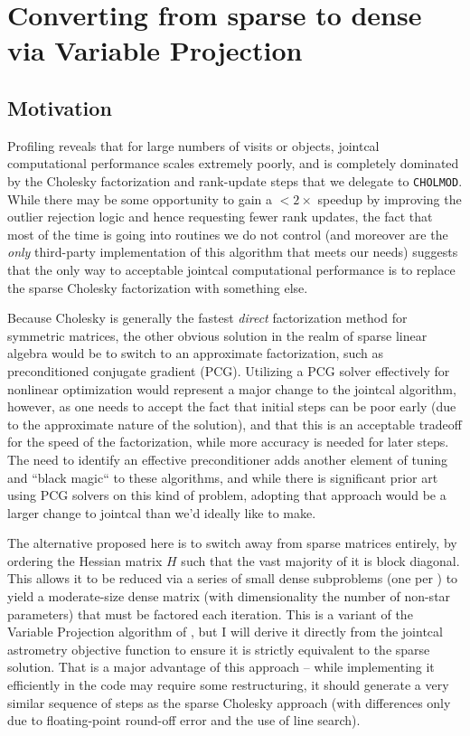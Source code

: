 \section{Converting from sparse to dense via Variable Projection}

\subsection{Motivation}

Profiling reveals that for large numbers of visits or objects, jointcal computational performance scales extremely poorly, and is completely dominated by the Cholesky factorization and rank-update steps that we delegate to \texttt{CHOLMOD}.
While there may be some opportunity to gain a $<2\times$ speedup by improving the outlier rejection logic and hence requesting fewer rank updates, the fact that most of the time is going into routines we do not control (and moreover are the \emph{only} third-party implementation of this algorithm that meets our needs) suggests that the only way to acceptable jointcal computational performance is to replace the sparse Cholesky factorization with something else.

Because Cholesky is generally the fastest \emph{direct} factorization method for symmetric matrices, the other obvious solution in the realm of sparse linear algebra would be to switch to an approximate factorization, such as preconditioned conjugate gradient (PCG).
Utilizing a PCG solver effectively for nonlinear optimization would represent a major change to the jointcal algorithm, however, as one needs to accept the fact that initial steps can be poor early (due to the approximate nature of the solution), and that this is an acceptable tradeoff for the speed of the factorization, while more accuracy is needed for later steps.
The need to identify an effective preconditioner adds another element of tuning and ``black magic`` to these algorithms, and while there is significant prior art using PCG solvers on this kind of problem, adopting that approach would be a larger change to jointcal than we'd ideally like to make.

The alternative proposed here is to switch away from sparse matrices entirely, by ordering the Hessian matrix $H$ such that the vast majority of it is block diagonal.
This allows it to be reduced via a series of small dense subproblems (one per ) to yield a moderate-size dense matrix (with dimensionality the number of non-star parameters) that must be factored each iteration.
This is a variant of the Variable Projection algorithm of \citet{1973SJNA...10..413G}, but I will derive it directly from the jointcal astrometry objective function  to ensure it is strictly equivalent to the sparse solution.
That is a major advantage of this approach -- while implementing it efficiently in the code may require some restructuring, it should generate a very similar sequence of steps as the sparse Cholesky approach (with differences only due to floating-point round-off error and the use of line search).


